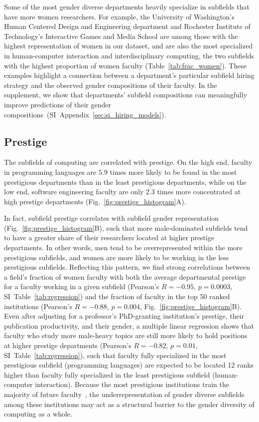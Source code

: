 \documentclass[reprint, twocolumn, aps, nofootinbib, superscriptaddress, longbibliography]{revtex4-1}
\begin{document}
Some of the most gender diverse departments heavily specialize in subfields that have more women researchers. For example, the University of Washington's Human Centered Design and Engineering department and Rochester Institute of Technology's Interactive Games and Media School are among those with the highest representation of women in our dataset, and are also the most specialized in human-computer interaction and interdisciplinary computing, the two subfields with the highest proportion of women faculty (Table~\ref{tab:frac_women}). These examples highlight a connection between a department's particular subfield hiring strategy and the observed gender compositions of their faculty. In the supplement, we show that departments' subfield compositions can meaningfully improve predictions of their gender compositions~(SI~Appendix~\ref{sec:si_hiring_models}). 

\subsection{Prestige} 

The subfields of computing are correlated with prestige. On the high end, faculty in programming languages are $5.9$ times more likely to be found in the most prestigious departments than in the least prestigious departments, while on the low end, software engineering faculty are only $2.3$ times more concentrated at high prestige departments (Fig.~\ref{fig:prestige_histogram}A). 

In fact, subfield prestige correlates with subfield gender representation (Fig.~\ref{fig:prestige_histogram}B), such that more male-dominated subfields tend to have a greater share of their researchers located at higher prestige departments. In other words, men tend to be overrepresented within the more prestigious subfields, and women are more likely to be working in the less prestigious subfields. Reflecting this pattern, we find strong correlations between a field's fraction of women faculty with both the average departmental prestige for a faculty working in a given subfield (Pearson’s $R= -0.95$, $p = 0.0003$, SI~Table~\ref{tab:regression}) and the fraction of faculty in the top 50 ranked institutions (Pearson's $R = -0.88$, $p = 0.004$, Fig.~\ref{fig:prestige_histogram}B). Even after adjusting for a professor's PhD-granting institution's prestige, their publication productivity, and their gender, a multiple linear regression shows that faculty who study more male-heavy topics are still more likely to hold positions at higher prestige departments (Pearson’s $R= -0.82$, $p = 0.01$, SI~Table~\ref{tab:regression}), such that faculty fully specialized in the most prestigious subfield (programming languages) are expected to be located 12 ranks higher than faculty fully specialized in the least prestigious subfield (human-computer interaction). Because the most prestigious institutions train the majority of future faculty~\cite{clauset2015systematic, way2016gender}, the underrepresentation of gender diverse subfields among these institutions may act as a structural barrier to the gender diversity of computing as a whole. 
\end{document}
